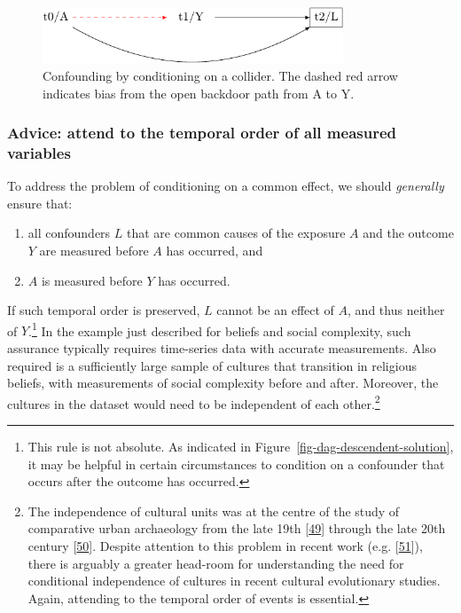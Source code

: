 \documentclass[
  singlecolumn]{article}
\providecommand{\tightlist}{%
  \setlength{\itemsep}{0pt}\setlength{\parskip}{0pt}}\usepackage{longtable,booktabs,array}
\begin{document}
\begin{figure}

{\centering \includegraphics[width=0.8\textwidth,height=\textheight]{causal-dags_files/figure-pdf/fig-dag-common-effect-1.pdf}

}

\caption{\label{fig-dag-common-effect}Confounding by conditioning on a
collider. The dashed red arrow indicates bias from the open backdoor
path from A to Y.}

\end{figure}

\hypertarget{advice-attend-to-the-temporal-order-of-all-measured-variables-1}{%
\subsubsection{Advice: attend to the temporal order of all measured
variables}\label{advice-attend-to-the-temporal-order-of-all-measured-variables-1}}

To address the problem of conditioning on a common effect, we should
\emph{generally} ensure that:

\begin{enumerate}
\def\labelenumi{\arabic{enumi}.}
\tightlist
\item
  all confounders \(L\) that are common causes of the exposure \(A\) and
  the outcome \(Y\) are measured before \(A\) has occurred, and
\item
  \(A\) is measured before \(Y\) has occurred.
\end{enumerate}

If such temporal order is preserved, \(L\) cannot be an effect of \(A\),
and thus neither of \(Y\).\footnote{This rule is not absolute. As
  indicated in Figure~\ref{fig-dag-descendent-solution}, it may be
  helpful in certain circumstances to condition on a confounder that
  occurs after the outcome has occurred.} In the example just described
for beliefs and social complexity, such assurance typically requires
time-series data with accurate measurements. Also required is a
sufficiently large sample of cultures that transition in religious
beliefs, with measurements of social complexity before and after.
Moreover, the cultures in the dataset would need to be independent of
each other.\footnote{The independence of cultural units was at the
  centre of the study of comparative urban archaeology from the late
  19th {[}\protect\hyperlink{ref-decoulanges1903}{49}{]} through the
  late 20th century {[}\protect\hyperlink{ref-wheatley1971}{50}{]}.
  Despite attention to this problem in recent work (e.g.
  {[}\protect\hyperlink{ref-watts2016}{51}{]}), there is arguably a
  greater head-room for understanding the need for conditional
  independence of cultures in recent cultural evolutionary studies.
  Again, attending to the temporal order of events is essential.}
\end{document}
